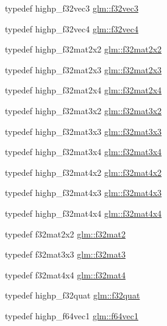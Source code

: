 \begin{DoxyCompactItemize}
\item 
typedef highp\+\_\+f32vec3 \hyperlink{group__gtc__type__precision_ga9b74939fb3bdd450be65f798037dd79d}{glm\+::f32vec3}
\item 
typedef highp\+\_\+f32vec4 \hyperlink{group__gtc__type__precision_gab6254ab9d409cce6579d7dc75dd34114}{glm\+::f32vec4}
\item 
typedef highp\+\_\+f32mat2x2 \hyperlink{group__gtc__type__precision_ga4eb16d89ecff72fa77f10c9a1e7ca475}{glm\+::f32mat2x2}
\item 
typedef highp\+\_\+f32mat2x3 \hyperlink{group__gtc__type__precision_ga5ad96c3a7d4c81520d1f30bf5dcdc2b6}{glm\+::f32mat2x3}
\item 
typedef highp\+\_\+f32mat2x4 \hyperlink{group__gtc__type__precision_gaba05bfeff59b12ea8e8ad2f6bfd8eece}{glm\+::f32mat2x4}
\item 
typedef highp\+\_\+f32mat3x2 \hyperlink{group__gtc__type__precision_ga43fa9ba1875db74cba2cea33321a77ff}{glm\+::f32mat3x2}
\item 
typedef highp\+\_\+f32mat3x3 \hyperlink{group__gtc__type__precision_ga56465dc40dd0e35221f00bdf44fb7c2e}{glm\+::f32mat3x3}
\item 
typedef highp\+\_\+f32mat3x4 \hyperlink{group__gtc__type__precision_ga9d953c44b7bf260d2f2e61d73dc2ab08}{glm\+::f32mat3x4}
\item 
typedef highp\+\_\+f32mat4x2 \hyperlink{group__gtc__type__precision_ga6aee56c6561190811699bfd2b1cd0d57}{glm\+::f32mat4x2}
\item 
typedef highp\+\_\+f32mat4x3 \hyperlink{group__gtc__type__precision_ga5102ae88531e072efe57e75354e10347}{glm\+::f32mat4x3}
\item 
typedef highp\+\_\+f32mat4x4 \hyperlink{group__gtc__type__precision_ga939fc7fbeb62575aca543d3a0342d807}{glm\+::f32mat4x4}
\item 
typedef f32mat2x2 \hyperlink{group__gtc__type__precision_ga5a8b82f5ef3eb6355640d57466793d9b}{glm\+::f32mat2}
\item 
typedef f32mat3x3 \hyperlink{group__gtc__type__precision_gaf8d666dea6f652c21f0c1515ce522090}{glm\+::f32mat3}
\item 
typedef f32mat4x4 \hyperlink{group__gtc__type__precision_ga6bf98d2ab0eb4889e5190c26e1853292}{glm\+::f32mat4}
\item 
typedef highp\+\_\+f32quat \hyperlink{group__gtc__type__precision_gafc69e0f1b9ac1a001bb4b1b9710d4f92}{glm\+::f32quat}
\item 
typedef highp\+\_\+f64vec1 \hyperlink{group__gtc__type__precision_ga55bdb96a24de2e3531c74310b12ba5d7}{glm\+::f64vec1}

\end{DoxyCompactItemize}
